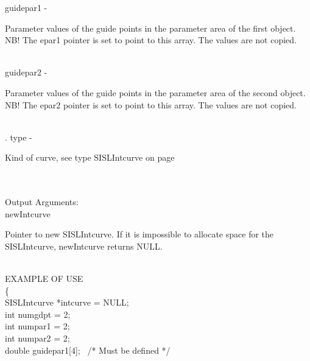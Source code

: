         \>\>    {\fov guidepar1}\> - \> \begin{minipg2}
                                Parameter values of the guide points in the parameter
                                area of the first object.
                                NB! The epar1 pointer is set to point to this
                                array. The values are not copied.
                                \end{minipg2}\\[0.3ex]
        \>\>    {\fov guidepar2}\> - \> \begin{minipg2}
                                Parameter values of the guide points in the parameter
                                area of the second object.
                                NB! The epar2 pointer is set to point to this
                                array. The values are not copied.
                                \end{minipg2}\\[0.3ex].
        \>\>    {\fov type} \> - \> \begin{minipg2}
                                Kind of curve, see type SISLIntcurve on
                                page \pageref{SISLIntcurve}
                                \end{minipg2}\\
\\
        \>Output Arguments:\\
        \>\>    {\fov newIntcurve} \> \> \begin{minipg2}
                                 Pointer to new SISLIntcurve. If it is impossible
                                 to allocate space for the SISLIntcurve, newIntcurve
                                 returns NULL.
                                \end{minipg2}\\
\newpagetabs
EXAMPLE OF USE\\
                \>      \{ \\
                \>\>    SISLIntcurve    \>      *{\fov intcurve = NULL};\\
                \>\>    int    \>       {\fov numgdpt} = 2;\\
                \>\>    int    \>       {\fov numpar1} = 2;\\
                \>\>    int    \>       {\fov numpar2} = 2;\\
                \>\>    double \>       {\fov guidepar1}[4]; \, /* Must be defined */\\
